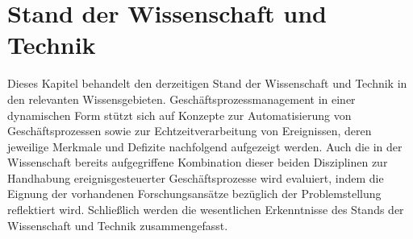 \chapter{Stand der Wissenschaft und Technik}\label{ch:Grundlagen}
Dieses Kapitel behandelt den derzeitigen Stand der Wissenschaft und Technik in den relevanten Wissensgebieten. Geschäftsprozessmanagement in einer dynamischen Form stützt sich auf Konzepte zur Automatisierung von Geschäftsprozessen sowie zur Echtzeitverarbeitung von Ereignissen, deren jeweilige Merkmale und Defizite nachfolgend aufgezeigt werden.
Auch die in der Wissenschaft bereits aufgegriffene Kombination dieser beiden Disziplinen zur Handhabung ereignisgesteuerter Geschäftsprozesse wird evaluiert, indem die Eignung der vorhandenen Forschungsansätze bezüglich der Problemstellung reflektiert wird.
Schließlich werden die wesentlichen Erkenntnisse des Stands der Wissenschaft und Technik zusammengefasst.



